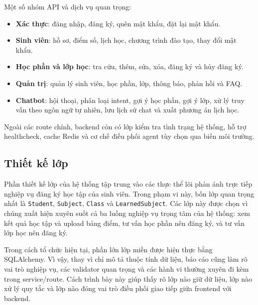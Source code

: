 \documentclass[12pt,a4paper]{report}
\begin{document}
Một số nhóm API và dịch vụ quan trọng:
\begin{itemize}
    \item \textbf{Xác thực}: đăng nhập, đăng ký, quên mật khẩu, đặt lại mật khẩu.
    \item \textbf{Sinh viên}: hồ sơ, điểm số, lịch học, chương trình đào tạo, thay đổi mật khẩu.
    \item \textbf{Học phần và lớp học}: tra cứu, thêm, sửa, xóa, đăng ký và hủy đăng ký.
    \item \textbf{Quản trị}: quản lý sinh viên, học phần, lớp, thông báo, phản hồi và FAQ.
    \item \textbf{Chatbot}: hội thoại, phân loại intent, gợi ý học phần, gợi ý lớp, xử lý truy vấn theo ngôn ngữ tự nhiên, lưu lịch sử chat và xuất phương án lịch học.
\end{itemize}

Ngoài các route chính, backend còn có lớp kiểm tra tình trạng hệ thống, hỗ trợ healthcheck, cache Redis và cơ chế điều phối agent tùy chọn qua biến môi trường.

\subsection{Thiết kế lớp}
Phần thiết kế lớp của hệ thống tập trung vào các thực thể lõi phản ánh trực tiếp nghiệp vụ đăng ký học tập của sinh viên. Trong phạm vi này, bốn lớp quan trọng nhất là \texttt{Student}, \texttt{Subject}, \texttt{Class} và \texttt{LearnedSubject}. Các lớp này được chọn vì chúng xuất hiện xuyên suốt cả ba luồng nghiệp vụ trọng tâm của hệ thống: xem kết quả học tập và upload bảng điểm, tư vấn học phần nên đăng ký, và tư vấn lớp học nên đăng ký.

Trong cách tổ chức hiện tại, phần lớn lớp miền được hiện thực bằng SQLAlchemy. Vì vậy, thay vì chỉ mô tả thuộc tính dữ liệu, báo cáo cũng làm rõ vai trò nghiệp vụ, các validator quan trọng và các hành vi thường xuyên đi kèm trong service/route. Cách trình bày này giúp thấy rõ lớp nào giữ dữ liệu, lớp nào xử lý quy tắc và lớp nào đóng vai trò điều phối giao tiếp giữa frontend với backend.
\end{document}
